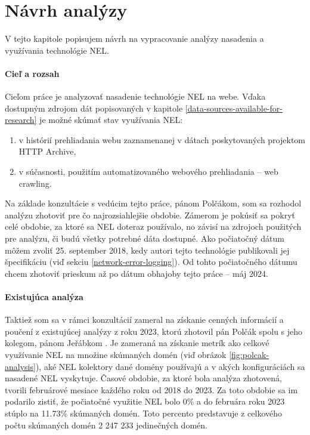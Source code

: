 \chapter{Návrh analýzy}
\label{possible-analysis-strategies}


V tejto kapitole popisujem návrh na vypracovanie analýzy nasadenia a využívania technológie NEL.

\subsubsection{Cieľ a rozsah}

Cieľom práce je analyzovať nasadenie technológie NEL na webe. 
Vďaka dostupným zdrojom dát popisovaných v kapitole \ref{data-sources-available-for-research} je možné skúmať stav využívania NEL:
\begin{enumerate}
    \item v histórií prehliadania webu zaznamenanej v dátach poskytovaných projektom HTTP Archive,
    \item v súčasnosti, použitím automatizovaného webového prehliadania -- web crawling.
\end{enumerate}

Na základe konzultácie s vedúcim tejto práce, pánom Polčákom, som sa rozhodol analýzu zhotoviť pre čo 
najrozsiahlejšie obdobie.
Zámerom je pokúsiť sa pokryť celé obdobie, za ktoré sa NEL doteraz používalo, no závisí na zdrojoch použitých pre analýzu, či budú všetky potrebné dáta dostupné.
Ako počiatočný dátum môžem zvoliť 25. september 2018, kedy autori tejto technológie publikovali jej špecifikáciu (viď sekciu \ref{network-error-logging}).
Od tohto počiatočného dátumu chcem zhotoviť prieskum až po dátum obhajoby tejto práce -- máj 2024.

\subsubsection{Existujúca analýza}

Taktiež som sa v rámci konzultácií zameral na získanie cenných informácií a poučení z existujúcej analýzy z roku 2023,
ktorú zhotovil pán Polčák spolu s jeho kolegom, pánom Jeřábkom \cite{nel-http-archive}.
Je zameraná na získanie metrík ako celkové využívanie NEL na množine skúmaných domén (viď obrázok \ref{fig:polcak-analysis}), aké NEL kolektory dané domény používajú a v akých konfiguráciách sa nasadené NEL vyskytuje.
Časové obdobie, za ktoré bola analýza zhotovená, tvorili februárové mesiace každého roku od 2018 do 2023. 
Za toto obdobie sa im podarilo zistiť, že počiatočné využitie NEL bolo 0\% a do februára roku 2023 stúplo na 11.73\% skúmaných domén.
Toto percento predstavuje z celkového počtu skúmaných domén 2 247 233 jedinečných domén.

